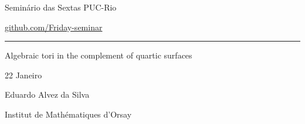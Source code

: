 


\begin{minipage}{\textwidth}
	\begin{minipage}{1\textwidth}
		Semin\'ario das Sextas \hfill PUC-Rio
		
		{\small\hfill\href{https://github.com/Friday-seminar/}{github.com/Friday-seminar}}
	\end{minipage}
\end{minipage}\vspace{.2cm}\hrule

\vspace{10pt}

{\Huge Algebraic tori in the complement of quartic surfaces}

\vspace{1em}
22 Janeiro

\hfill{\Large Eduardo Alvez da Silva}

\hfill{\large Institut de Mathématiques d'Orsay}

\tableofcontents

